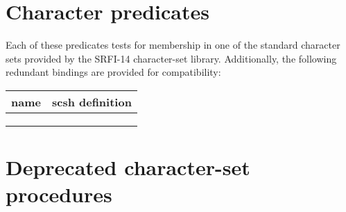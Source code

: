\section{Character predicates}

\character\boolean
{}\character\boolean
{}\character\boolean
{}\character\boolean
{}\character\boolean
{}\character\boolean
{}\character\boolean
{}\character\boolean
{}\character\boolean
{}\character\boolean
{}\character\boolean
{}\character\boolean
{}\character\boolean
{}\character\boolean
\begin{desc}
Each of these predicates tests for membership in one of the standard
character sets provided by the SRFI-14 character-set library.
Additionally, the following redundant bindings are provided for {\RnRS}
compatibility:
\begin{inset}
\begin{tabular}{ll}
    {\RnRS} name & scsh definition \\ \hline
    \ex{char-alphabetic?}   & \ex{char-letter+digit?} \\
    \ex{char-numeric?}      & \ex{char-digit?}        \\
    \ex{char-alphanumeric?} & \ex{char-letter+digit?}
\end{tabular}
\end{inset}
\end{desc}


\section{Deprecated character-set procedures}
\label{sec:char-sets}

